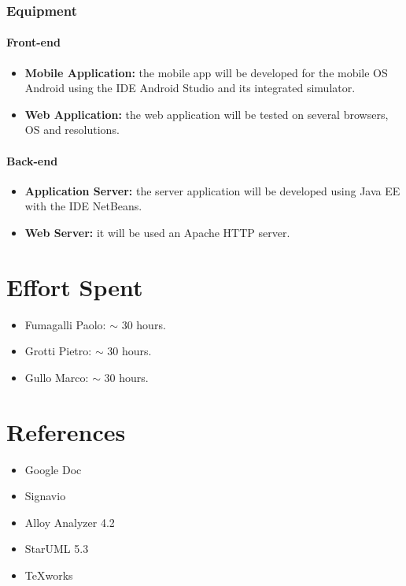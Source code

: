 \documentclass{article}
\begin{document}
			\subsubsection{Equipment}
			\paragraph{Front-end}
			\begin{itemize}
			\item{}\textbf{Mobile Application:} the mobile app will be developed for the mobile OS Android using the IDE Android Studio and its integrated simulator.
			\item{}\textbf{Web Application:} the web application will be tested on several browsers, OS and resolutions.
			\end{itemize}
			\paragraph{Back-end}
			\begin{itemize}
			\item{}\textbf{Application Server:} the server application will be developed using Java EE with the IDE NetBeans.
			\item{}\textbf{Web Server:}  it will be used an Apache HTTP server.
			\end{itemize}
	\newpage
	\section{Effort Spent}
		\begin{itemize}
		\item{Fumagalli Paolo:} $\sim$ 30 hours.
		\item{Grotti Pietro:} $\sim$ 30 hours.
		\item{Gullo Marco:} $\sim$ 30 hours.
		\end{itemize}
	\section{References}
		\begin{itemize}
		\item{} Google Doc
		\item{} Signavio
		\item{} Alloy Analyzer 4.2
		\item{} StarUML 5.3
		\item{} TeXworks
		
		\end{itemize}
\end{document}

